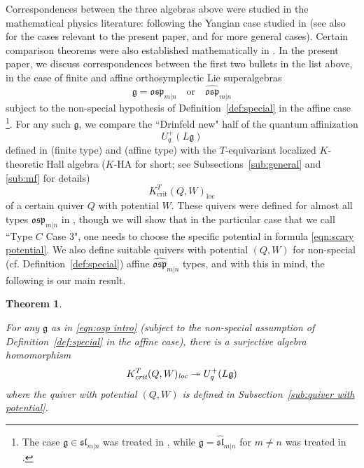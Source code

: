 \documentclass{amsart}
\newtheorem{theorem}[subsection]{Theorem}
\def\fg{{\mathfrak{g}}}
\def\fsl{{\mathfrak{sl}}}
\def\fosp{\mathfrak{osp}}
\begin{document}
\medskip 

\noindent Correspondences between the three algebras above were studied in the mathematical physics literature: \cite{GLY, GY, NW} following the Yangian case studied in \cite{LY} (see also \cite{Bao} for the cases relevant to the present paper, and \cite{BY,L} for more general cases). Certain comparison theorems were also established mathematically in \cite{N Red, RSYZ, RSYZ 2, VV}. In the present paper, we discuss correspondences between the first two bullets in the list above, in the case of finite and affine orthosymplectic Lie superalgebras
\begin{equation}
\label{eqn:osp intro}
\fg = \fosp_{m|n} \quad \text{or} \quad \widehat{\fosp}_{m|n}
\end{equation}
subject to the non-special hypothesis of Definition~\ref{def:special} in the affine case \footnote{The case $\fg \in \fsl_{m|n}$ was treated in \cite{T}, while $\fg = \widehat{\fsl}_{m|n}$ for $m \neq n$ was treated in \cite{N Red}.}. For any such $\fg$, we compare the ``Drinfeld new" half of the quantum affinization
\begin{equation}
\label{eqn:quantum loop intro}
U_q^+(L\fg)
\end{equation}
defined in \cite{BFK,XZ} (finite type) and \cite{NT} (affine type) with the $T$-equivariant localized $K$-theoretic Hall algebra ($K$-HA for short; see Subsections~\ref{sub:general} and \ref{sub:mf} for details)
\begin{equation}
\label{eqn:k-ha intro}
K^T_{\text{crit}}(Q,W)_{\text{loc}}
\end{equation} 
of a certain quiver $Q$ with potential $W$. These quivers were defined for almost all types $\fosp_{m|n}$ in \cite{Bao}, though we will show that in the particular case that we call ``Type $C$ Case 3", one needs to choose the specific potential in formula \eqref{eqn:scary potential}. We also define suitable quivers with potential $(Q,W)$ for non-special (cf. Definition~\ref{def:special}) affine $\widehat{\fosp}_{m|n}$ types, and with this in mind, the following is our main result.

\medskip 

\begin{theorem}
\label{thm:main}

For any $\fg$ as in \eqref{eqn:osp intro} (subject to the non-special assumption of Definition~\ref{def:special} in the affine case), there is a surjective algebra homomorphism
\begin{equation}
\label{eqn:hom main}
K^T_{\emph{crit}}(Q,W)_{\emph{loc}} \twoheadrightarrow U_q^+(L\fg)
\end{equation}
where the quiver with potential $(Q,W)$ is defined in Subsection~\ref{sub:quiver with potential}.

\end{theorem}
\end{document}
